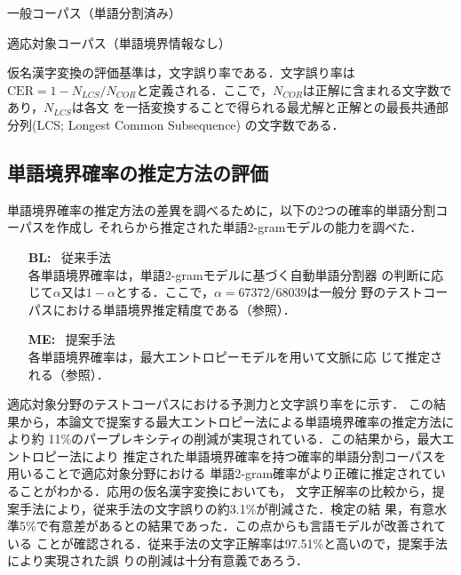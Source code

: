 \documentclass[japanese]{jnlp_1.4}
\begin{document}
\begin{table}[t]
\begin{minipage}[t]{0.47\textwidth}
\caption{一般コーパス（単語分割済み）}
\label{table:corpus}

\end{minipage}
\hfill
  \begin{minipage}[t]{0.47\textwidth}
  \caption{適応対象コーパス（単語境界情報なし）}

  \label{table:raw-corpus}
  \end{minipage}
\end{table}

仮名漢字変換の評価基準は，文字誤り率である．文字誤り率は$\mbox{CER} = 1-N_{LCS}/
N_{COR}$と定義される．ここで，$N_{COR}$は正解に含まれる文字数であり，$N_{LCS}$は各文
を一括変換することで得られる最尤解と正解との最長共通部分列(LCS; Longest Common
Subsequence) \cite{文字列中のパターン照合のためのアルゴリズム}の文字数である．



\subsection{単語境界確率の推定方法の評価}

単語境界確率の推定方法の差異を調べるために，以下の2つの確率的単語分割コーパスを作成し
それらから推定された単語2-gramモデルの能力を調べた．
\begin{itemize}
\item[\bf BL:] \ 従来手法 \\ 各単語境界確率は，単語2-gramモデルに基づく自動単語分割器
  の判断に応じて$\alpha$又は$1-\alpha$とする．ここで，$\alpha = 67372/68039$は一般分
  野のテストコーパスにおける単語境界推定精度である（参照）．

\item[\bf ME:] \ 提案手法 \\ 各単語境界確率は，最大エントロピーモデルを用いて文脈に応
じて推定される（参照）．
\end{itemize}

適応対象分野のテストコーパスにおける予測力と文字誤り率をに示す．
この結果から，本論文で提案する最大エントロピー法による単語境界確率の推定方法により約
11\%のパープレキシティの削減が実現されている．この結果から，最大エントロピー法により
推定された単語境界確率を持つ確率的単語分割コーパスを用いることで適応対象分野における
単語2-gram確率がより正確に推定されていることがわかる．応用の仮名漢字変換においても，
文字正解率の比較から，提案手法により，従来手法の文字誤りの約3.1\%が削減さた．検定の結
果，有意水準5\%で有意差があるとの結果であった．この点からも言語モデルが改善されている
ことが確認される．従来手法の文字正解率は97.51\%と高いので，提案手法により実現された誤
りの削減は十分有意義であろう．
\end{document}
